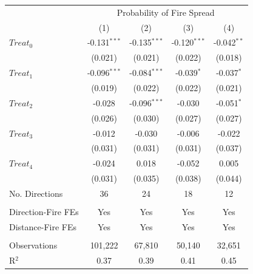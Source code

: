 \begingroup
\centering
\begin{tabular}{lcccc}
   \toprule
    & \multicolumn{4}{c}{Probability of Fire Spread}\\
                      & (1)            & (2)            & (3)            & (4)\\  
   \midrule 
   $Treat_0$          & -0.131$^{***}$ & -0.135$^{***}$ & -0.120$^{***}$ & -0.042$^{**}$\\   
                      & (0.021)        & (0.021)        & (0.022)        & (0.018)\\   
   $Treat_1$          & -0.096$^{***}$ & -0.084$^{***}$ & -0.039$^{*}$   & -0.037$^{*}$\\   
                      & (0.019)        & (0.022)        & (0.022)        & (0.021)\\   
   $Treat_2$          & -0.028         & -0.096$^{***}$ & -0.030         & -0.051$^{*}$\\   
                      & (0.026)        & (0.030)        & (0.027)        & (0.027)\\   
   $Treat_3$          & -0.012         & -0.030         & -0.006         & -0.022\\   
                      & (0.031)        & (0.031)        & (0.031)        & (0.037)\\   
   $Treat_4$          & -0.024         & 0.018          & -0.052         & 0.005\\   
                      & (0.031)        & (0.035)        & (0.038)        & (0.044)\\   
   No. Directions     & 36             & 24             & 18             & 12\\  
    \\
   Direction-Fire FEs & Yes            & Yes            & Yes            & Yes\\  
   Distance-Fire FEs  & Yes            & Yes            & Yes            & Yes\\  
    \\
   Observations       & 101,222        & 67,810         & 50,140         & 32,651\\  
   R$^2$              & 0.37           & 0.39           & 0.41           & 0.45\\  
   \bottomrule
\end{tabular}
\par\endgroup

